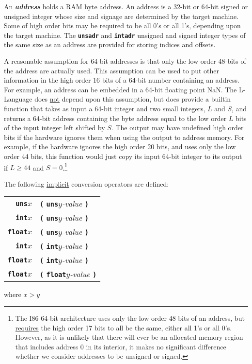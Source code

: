 \documentclass[12pt]{article}
\newcommand{\TT}[1]{{\tt \bfseries #1}}
\newcommand{\key}[1]{{\bf \em #1}\index{#1}}
\begin{document}
An \key{address} holds a RAM byte address.
An address is a 32-bit or 64-bit signed or unsigned integer whose size
and signage are determined by the target machine.
Some of high order bits may be
required to be all 0's or all 1's, depending upon
the target machine.  The \TT{unsadr} and \TT{intadr}
unsigned and signed integer types of the same size
as an address are provided for storing indices and offsets.

A reasonable assumption for 64-bit addresses is that only the low
order 48-bits of the address are actually used.  This assumption can
be used to put other information in the high order 16 bits
of a 64-bit number containing an address.  For example, an address
can be embedded in a 64-bit floating point NaN.  The L-Language does
\underline{not} depend upon this assumption, but does provide a builtin function
that takes as input a 64-bit integer and two small integers, $L$ and $S$,
and returns a 64-bit address containing
the byte address equal to the low order $L$ bits of the input integer
left shifted by $S$.  The output may have undefined high order bits if
the hardware ignores them when using the output to address memory.
For example, if the hardware ignores the high order 20 bits, and uses only the
low order 44 bits,
this function would just copy its input 64-bit integer to its output
if $L\geq 44$ and $S=0$.\footnote{The I86 64-bit architecture
uses only the low order 48 bits of an address, but \underline{requires}
the high order 17 bits to all be the same, either all 1's or all 0's.
However, as it is unlikely that there will ever be an allocated memory region
that includes address 0 in its interior, it makes no significant difference
whether we consider addresses to be unsigned or signed.}

The following \underline{implicit} conversion operators are defined:
\begin{center}

\begin{tabular}{r@{~}l}
\TT{uns}$x$ & \TT{(} \TT{uns}$y${\em -value} \TT{)} \\
\TT{int}$x$ & \TT{(} \TT{uns}$y${\em -value} \TT{)} \\
\TT{float}$x$ & \TT{(} \TT{uns}$y${\em -value} \TT{)} \\
\TT{int}$x$ & \TT{(} \TT{int}$y${\em -value} \TT{)} \\
\TT{float}$x$ & \TT{(} \TT{int}$y${\em -value} \TT{)} \\
\TT{float}$x$ & \TT{(} \TT{float}$y${\em -value} \TT{)} \\
\end{tabular}

where $x>y$

\end{center}
\end{document}
